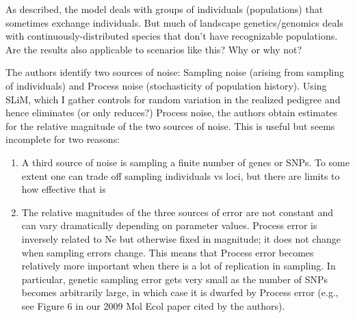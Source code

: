 \reply{
}

\begin{point}{}
    As described, the model deals with groups of individuals (populations) that
    sometimes exchange individuals.  But much of landscape genetics/genomics
    deals with continuously-distributed species that don’t have recognizable
    populations.  Are the results also applicable to scenarios like this?  Why
    or why not?
\end{point}


\begin{point}{}
    The authors identify two sources of noise: Sampling noise (arising from
    sampling of individuals) and Process noise (stochasticity of population
    history).  Using SLiM, which I gather controls for random variation in the
    realized pedigree and hence eliminates (or only reduces?) Process noise,
    the authors obtain estimates for the relative magnitude of the two sources
    of noise.  This is useful but seems incomplete for two reasons:
    \begin{enumerate}
        \item       A third source of noise is sampling a finite number of
            genes or SNPs.  To some extent one can trade off sampling
            individuals vs loci, but there are limits to how effective that is
        \item       The relative magnitudes of the three sources of error are
            not constant and can vary dramatically depending on parameter
            values.  Process error is inversely related to Ne but otherwise
            fixed in magnitude; it does not change when sampling errors change.
            This means that Process error becomes relatively more important
            when there is a lot of replication in sampling.  In particular,
            genetic sampling error gets very small as the number of SNPs
            becomes arbitrarily large, in which case it is dwarfed by Process
            error (e.g., see Figure 6 in our 2009 Mol Ecol paper cited by the
            authors).
    \end{enumerate}
\end{point}


